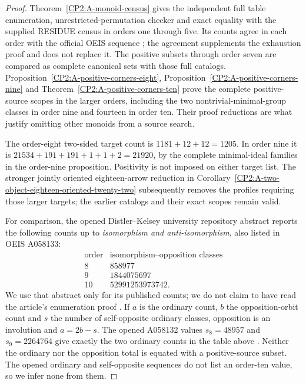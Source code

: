 \begin{proof}
Theorem~\ref{CP2:A-monoid-census} gives the independent full table
enumeration, unrestricted-permutation checker and exact equality
with the supplied RESIDUE census in orders one through five.
Its counts agree in each order with the official OEIS sequence
\cite{OEIS_A058129}; the agreement supplements the exhaustion
proof and does not replace it. The positive subsets through order
seven are compared as complete canonical sets with those full
catalogs. Proposition~\ref{CP2:A-positive-corners-eight},
Proposition~\ref{CP2:A-positive-corners-nine} and
Theorem~\ref{CP2:A-positive-corners-ten} prove the complete
positive-source scopes in the larger orders, including the two
nontrivial-minimal-group classes in order nine and fourteen in
order ten. Their proof reductions are what justify omitting other
monoids from a source search.

The order-eight two-sided target count is
$1181+12+12=1205$. In order nine it is
$21534+191+191+1+1+2=21920$, by the complete minimal-ideal
families in the order-nine proposition. Positivity is not imposed
on either target list. The stronger jointly oriented
eighteen-arrow reduction in
Corollary~\ref{CP2:A-two-object-eighteen-oriented-twenty-two}
subsequently removes the profiles requiring those larger targets;
the earlier catalogs and their exact scopes remain valid.

For comparison, the opened Distler--Kelsey university repository
abstract reports the following counts up to \emph{isomorphism and
anti-isomorphism}, also listed in OEIS A058133:
\[
\begin{array}{c|r}
\text{order}&\text{isomorphism--opposition classes}\\\hline
8&858977\\
9&1844075697\\
10&52991253973742.
\end{array}
\]
We use that abstract only for its published counts; we do not claim
to have read the article's enumeration proof
\cite{CP2-DistlerKelsey2009,OEIS_A058133}.
If $a$ is the ordinary count, $b$ the opposition-orbit count and
$s$ the number of self-opposite ordinary classes, opposition is
an involution and $a=2b-s$. The opened A058132 values
$s_8=48957$ and $s_9=2264764$ give exactly the two ordinary
counts in the table above \cite{OEIS_A058132}. Neither the
ordinary nor the opposition total is equated with a positive-source
subset. The opened ordinary and self-opposite sequences do not
list an order-ten value, so we infer none from them.
\end{proof}

